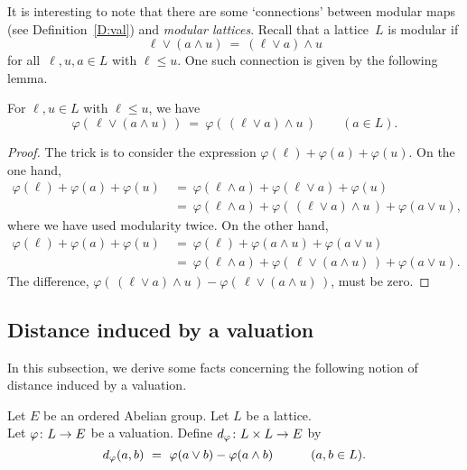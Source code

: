 \documentclass[main.tex]{subfiles}
\begin{document}
It is interesting to note that
there are some `connections'
between
modular maps (see Definition~\ref{D:val})
and \emph{modular lattices}.
Recall that a lattice~$L$ is modular if
\begin{equation*}
\ell \vee (a \wedge u) \ =\ (\ell \vee a) \wedge u
\end{equation*}
for all~$\ell,u,a \in L$ with $\ell \leq u$.
One such connection is given by the following lemma.
%
%
\begin{lem}
\label{L:modular-map-modular}
For $\ell,u\in L$ with $\ell\leq u$, we have
\begin{equation}
\label{eq:modular-map}
\varphi(\,\ell \vee (a \wedge u)\,) 
\ =\ 
\varphi(\,(\ell\vee a)\wedge u\,)
\qquad (a\in L).
\end{equation}
\end{lem}
\begin{proof}
The trick is to consider the expression 
$\varphi(\ell) + \varphi(a) + \varphi(u)$.
On the one hand,
\begin{align*}
\varphi(\ell) + \varphi(a) + \varphi(u)
\ &=\ \varphi(\ell\wedge a) + \varphi(\ell \vee a) + \varphi(u) \\
\ &=\ \varphi(\ell \wedge a)
      + \varphi(\,(\ell\vee a)\wedge u\,)
      + \varphi(a\vee u),
\end{align*}
where we have used modularity twice.
On the other hand,
\begin{align*}
\varphi(\ell) + \varphi(a) + \varphi(u)
\ &=\ \varphi(\ell) + \varphi(a\wedge u) + \varphi(a \vee u) \\
\ &=\ \varphi(\ell \wedge a)
      + \varphi(\,\ell\vee (a\wedge u)\,)
      + \varphi(a\vee u).
\end{align*}
The difference,
$\varphi(\,(\ell\vee a)\wedge u\,)
- \varphi(\,\ell\vee (a\wedge u)\,)$,
must be zero.
\end{proof}

%
%
%
%
\subsection{Distance induced by a valuation}
\label{SS:vals_d}
In this subsection,
we derive some facts 
concerning the following notion
of distance induced by a valuation.
\begin{dfn}
\label{D:d}
Let $E$ be an ordered Abelian group.
Let $L$ be a lattice.\\
Let $\varphi\colon L \rightarrow E$ be a valuation.
Define $d_{\smash{\varphi}}\colon L\times L \rightarrow E$ by
\begin{equation*}
\ld\varphi(a,b)\ =\  \varphi(a\vee b) - \varphi(a \wedge b)
\qquad\quad(a,b\in L).
\end{equation*}
\end{dfn}
\end{document}

